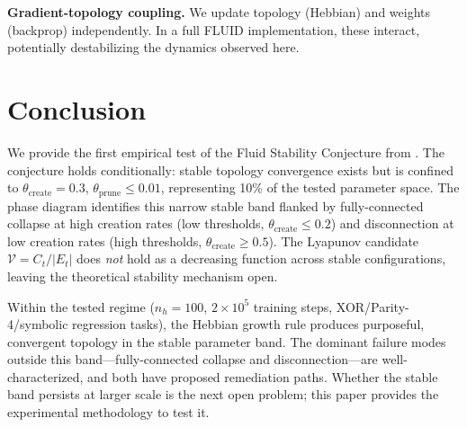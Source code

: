 \documentclass[12pt]{article}
\begin{document}
\textbf{Gradient-topology coupling.} We update topology (Hebbian) and weights (backprop) independently. In a full FLUID implementation, these interact, potentially destabilizing the dynamics observed here.

\section{Conclusion}

We provide the first empirical test of the Fluid Stability Conjecture from \cite{lin2026fluid}. The conjecture holds conditionally: stable topology convergence exists but is confined to $\theta_{\text{create}} = 0.3$, $\theta_{\text{prune}} \leq 0.01$, representing 10\% of the tested parameter space. The phase diagram identifies this narrow stable band flanked by fully-connected collapse at high creation rates (low thresholds, $\theta_{\text{create}} \leq 0.2$) and disconnection at low creation rates (high thresholds, $\theta_{\text{create}} \geq 0.5$). The Lyapunov candidate $\mathcal{V} = C_t / |E_t|$ does \textit{not} hold as a decreasing function across stable configurations, leaving the theoretical stability mechanism open.

Within the tested regime ($n_h = 100$, $2 \times 10^5$ training steps, XOR/Parity-4/symbolic regression tasks), the Hebbian growth rule produces purposeful, convergent topology in the stable parameter band. The dominant failure modes outside this band---fully-connected collapse and disconnection---are well-characterized, and both have proposed remediation paths. Whether the stable band persists at larger scale is the next open problem; this paper provides the experimental methodology to test it.
\end{document}
